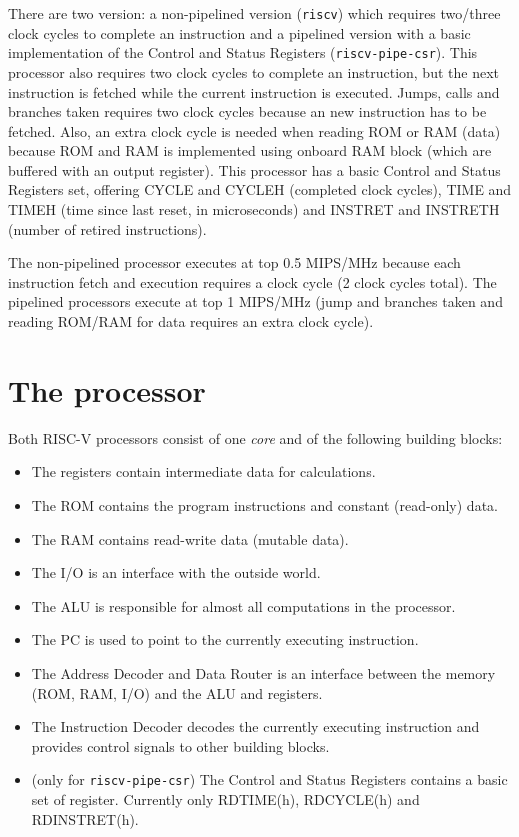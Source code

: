 \documentclass[12pt]{article}
\begin{document}
There are two version: a non-pipelined version (\texttt{riscv}) which requires two/three clock cycles to complete an instruction and a pipelined version with a basic implementation of the Control and Status Registers (\texttt{riscv-pipe-csr}). This processor also requires two clock cycles to complete an instruction, but the next instruction is fetched while the current instruction is executed. Jumps, calls and branches taken requires two clock cycles because an new instruction has to be fetched. Also, an extra clock cycle is needed when reading ROM or RAM (data) because ROM and RAM is implemented using onboard RAM block (which are buffered with an output register). This processor has a basic Control and Status Registers set, offering CYCLE and CYCLEH (completed clock cycles), TIME and TIMEH (time since last reset, in microseconds) and INSTRET and INSTRETH (number of retired instructions).

The non-pipelined processor executes at top 0.5 MIPS/MHz because each instruction fetch and execution requires a clock cycle (2 clock cycles total). The pipelined processors execute at top 1 MIPS/MHz (jump and branches taken and reading ROM/RAM for data requires an extra clock cycle).
 
\section{The processor}
Both RISC-V processors consist of one \textit{core} and of the following building blocks:

\begin{itemize}
\item The registers contain intermediate data for calculations.
\item The ROM contains the program instructions and constant (read-only) data.
\item The RAM contains read-write data (mutable data).
\item The I/O is an interface with the outside world.
\item The ALU is responsible for almost all computations in the processor.
\item The PC is used to point to the currently executing instruction.
\item The Address Decoder and Data Router is an interface between the memory (ROM, RAM, I/O) and the ALU and registers.
\item The Instruction Decoder decodes the currently executing instruction and provides control signals to other building blocks.
\item (only for \texttt{riscv-pipe-csr}) The Control and Status Registers contains a basic set of register. Currently only RDTIME(h), RDCYCLE(h) and RDINSTRET(h).
\end{itemize}
\end{document}
